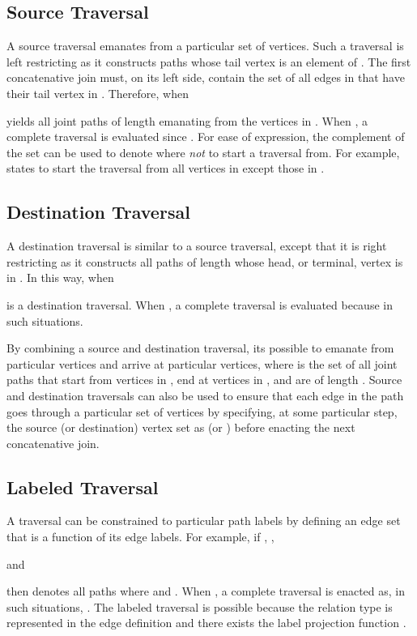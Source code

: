 \documentclass[10pt,conference,letterpaper]{IEEEtran}
\begin{document}
\subsection{Source Traversal}

A source traversal emanates from a particular set of vertices. Such a traversal is left restricting as it constructs paths whose tail vertex is an element of . The first concatenative join must, on its left side, contain the set of all edges in  that have their tail vertex in . Therefore, when 

 yields all joint paths of length  emanating from the vertices in . When , a complete traversal is evaluated since . For ease of expression, the complement of the set  can be used to denote where \textit{not} to start a traversal from. For example,  states to start the traversal from all vertices in  except those in .

\subsection{Destination Traversal}

A destination traversal is similar to a source traversal, except that it is right restricting as it constructs all paths of length  whose head, or terminal, vertex is in . In this way, when

 is a destination traversal. When , a complete traversal is evaluated because  in such situations.

By combining a source and destination traversal, its possible to emanate from particular vertices and arrive at particular vertices, where  is the set of all joint paths that start from vertices in , end at vertices in , and are of length . Source and destination traversals can also be used to ensure that each edge in the path goes through a particular set of vertices by specifying, at some particular  step, the source (or destination) vertex set as  (or ) before enacting the next concatenative join.

\subsection{Labeled Traversal}

A traversal can be constrained to particular path labels by defining an edge set that is a function of its edge labels. For example, if , ,

and

then  denotes all paths where  and . When , a complete traversal is enacted as, in such situations, . The labeled traversal is possible because the relation type is represented in the edge definition  and there exists the label projection function . 
\end{document}
